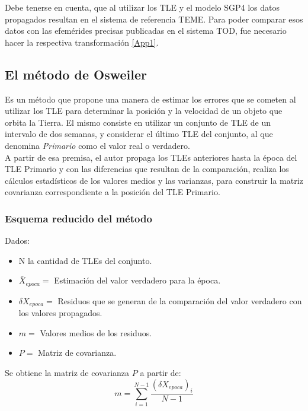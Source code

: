 {Debe tenerse en cuenta, que al utilizar los TLE y el modelo SGP4  los datos propagados resultan en el sistema de referencia \ac{TEME}. Para poder comparar esos datos con las efem\'erides precisas publicadas en el sistema TOD, fue necesario hacer la respectiva transformaci\'on \ref{App1}.\\

\subsection{ El m\'etodo de Osweiler}\label{subsec:osw}
Es un m\'etodo que propone una manera de estimar los errores que se cometen al utilizar los TLE para determinar la posici\'on y la velocidad de un objeto que orbita la Tierra.
El mismo consiste en utilizar un conjunto de TLE de un intervalo de dos semanas, y considerar el \'ultimo TLE del conjunto, al que denomina {\it{Primario}} como el valor real o verdadero.\\
A partir de esa premisa, el autor propaga los TLEs anteriores hasta la \'epoca del TLE Primario y con las diferencias que resultan de la comparaci\'on, realiza los c\'alculos estad\'isticos de los valores medios y las varianzas, para construir la matriz covarianza correspondiente a la posici\'on del TLE Primario.\\

\subsubsection*{Esquema reducido del m\'etodo}

Dados:
\begin{itemize}
\itemsep0em
 \item N la cantidad de TLEs del conjunto.
 \item $\bar{X}_{epoca} = $  Estimaci\'on del valor verdadero para la \'epoca.
 \item $\delta X_{epoca} = $ Residuos que se generan de la comparaci\'on del valor verdadero con los valores propagados.
 \item $m = $ Valores medios de los residuos.
 \item $P = $ Matriz de covarianza.
\end{itemize}

Se obtiene la matriz de covarianza $P$ a partir de:\\

\begin{equation}
 m=\sum_{i=1}^{N-1} \frac{(\delta X_{epoca})_{i}}{N-1} 
\end{equation}

}

